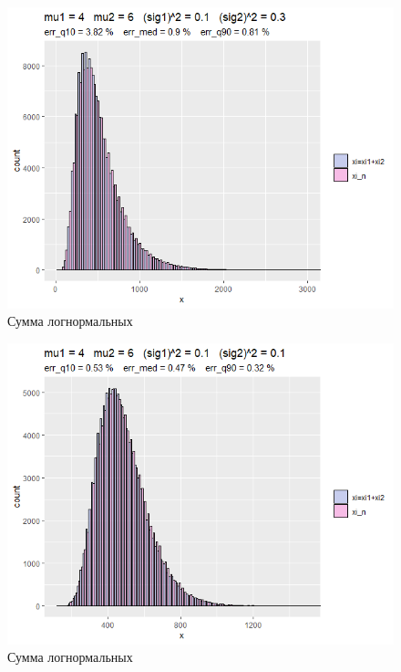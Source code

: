\documentclass[12pt]{article}
\begin{document}
\begin{figure}[h]
	\begin{center}
		
			\includegraphics[width=1\linewidth]{hist6.png}
			\caption{Сумма логнормальных} %
			\label{ris1} %
		
	\end{center}
\end{figure}

\begin{figure}[h]
	\begin{center}
			\includegraphics[width=1\linewidth]{hist1.png}
			\caption{Сумма логнормальных}
			\label{ris2}
	\end{center}
\end{figure}
\end{document}
